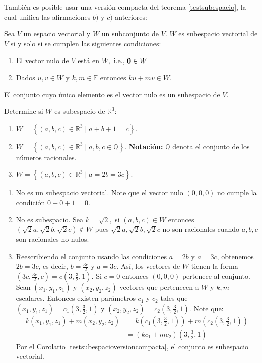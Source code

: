 También es posible usar una versión compacta del teorema \ref{testsubespacio}, la cual unifica las afirmaciones $b)$ y $c)$ anteriores: 

\begin{coro} \label{testsubespacioversioncompacta}
Sea $V$ un espacio vectorial y $W$ un subconjunto de $V.$ $W$ es subespacio vectorial de $V$ si y solo si se cumplen las siguientes condiciones:
\begin{enumerate}[$a)$]
\item El vector nulo de $V$ está en $W,$ i.e., ${\bf{0}}\in W.$
\item Dados $u,v\in W$ y $k, m \in \mathbb{F}$ entonces $ku+mv\in W.$
\end{enumerate}
\end{coro}
\begin{rem}El conjunto cuyo único elemento es el vector nulo es un subespacio de $V.$  
\end{rem}

\begin{example} Determine si $W$ es subespacio de $\mathbb{R}^3$:
\begin{enumerate}[$(a)$]
\item $W=\left\lbrace (a,b,c)\in \mathbb{R}^3 \mid a+b+1=c   \right\rbrace.$
\item $W=\left\lbrace (a,b,c)\in \mathbb{R}^3 \mid a, b, c \in \mathbb{Q}  \right\rbrace.$ \textbf{Notación:}  $\mathbb{Q}$ denota el conjunto de los números racionales.
\item $W=\left\lbrace (a,b,c)\in \mathbb{R}^3 \mid a=2b=3c  \right\rbrace.$
\end{enumerate}
\begin{myproof} 
\begin{enumerate}[$(a)$]
\item No es un subespacio vectorial. Note que el vector nulo $(0,0,0)$ no cumple la condición $0+0+1=0.$
\item No es subespacio. Sea $k=\sqrt{2},$ si $(a,b,c)\in W$ entonces $(\sqrt{2}a,\sqrt{2}b,\sqrt{2}c) \notin W$ pues $\sqrt{2}a, \sqrt{2}b, \sqrt{2}c$ no son racionales cuando $a, b, c$ son racionales no nulos.
\item Reescribiendo el conjunto usando las condiciones $a=2b$ y $a=3c$, obtenemos $2b=3c$, es decir, $b=\frac{3c}{2}$ y $a=3c$. Así, los vectores de $W$ tienen la forma $(3c, \frac{3c}{2}, c) = c(3, \frac{3}{2}, 1)$. Si $c=0$ entonces $(0,0,0)$ pertenece al conjunto. Sean $(x_1,y_1,z_1)$ y $(x_2,y_2,z_2)$ vectores que pertenecen a $W$ y $k,m$ escalares. Entonces existen parámetros $c_1$ y $c_2$ tales que $(x_1,y_1,z_1)=c_1(3,\frac{3}{2},1)$ y $(x_2,y_2,z_2)=c_2(3,\frac{3}{2},1).$ Note que:
\begin{align*}
k(x_1,y_1,z_1)+m(x_2,y_2,z_2)&=k\left(c_1(3,\frac{3}{2},1)\right)+m\left(c_2(3,\frac{3}{2},1)\right)\\&=\left(kc_1+mc_2\right)(3,\frac{3}{2},1)
\end{align*}
Por el Corolario \ref{testsubespacioversioncompacta}, el conjunto es subespacio vectorial.
\end{enumerate}
\end{myproof}
\end{example}

